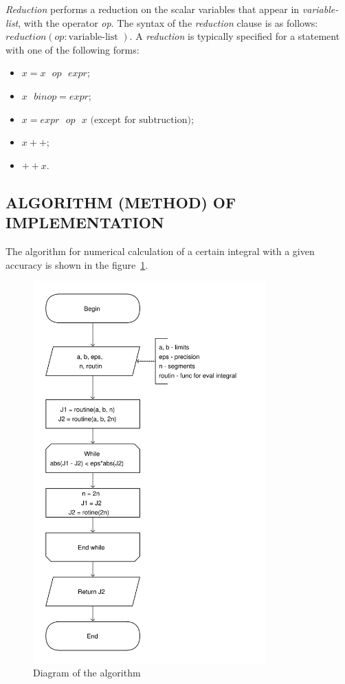 \textit{Reduction} performs a reduction on the scalar variables that appear in \textit{variable-list}, with the operator \textit{op}. The syntax of the \textit{reduction} clause is as follows: $reduction(op : \text{variable-list })$.
A \textit{reduction} is typically specified for a statement with one of the following forms:
\begin{itemize}
    \item $x = x\text{ }op\text{ }expr$;
    \item $x\text{ }binop = expr$;
    \item $x = expr\text{ }op\text{ }x\text{ (except for subtruction)}$;
    \item $x++$;
    \item $++x$.
\end{itemize}

\subsection{ALGORITHM (METHOD) OF IMPLEMENTATION}\label{subsec:algorithm}

The algorithm for numerical calculation of a certain integral with a given accuracy is shown in the figure~\ref{ris:diag}.

\begin{figure}[H]
    \center
    \includegraphics[width=0.8\textwidth]{img/graph.pdf}
    \caption{Diagram of the algorithm}
    \label{ris:diag}
\end{figure}

